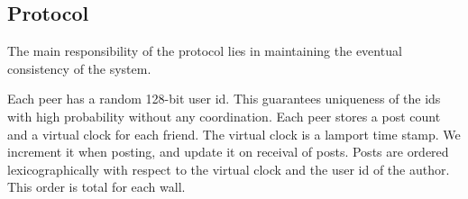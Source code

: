 \documentclass{report}
\begin{document}
\begin{figure}[H]
	\centering
	\hfill
	\hfill
	
\end{figure}

\subsection{Protocol}

The main responsibility of the protocol lies in maintaining the eventual consistency of the system.

Each peer has a random 128-bit user id. This guarantees uniqueness of the ids with high probability without any coordination.
Each peer stores a post count and a virtual clock for each friend. The virtual clock is a lamport time stamp. We increment it when posting, and update it on receival of posts. Posts are ordered lexicographically with respect to the virtual clock and the user id of the author. This order is total for each wall.
\end{document}
